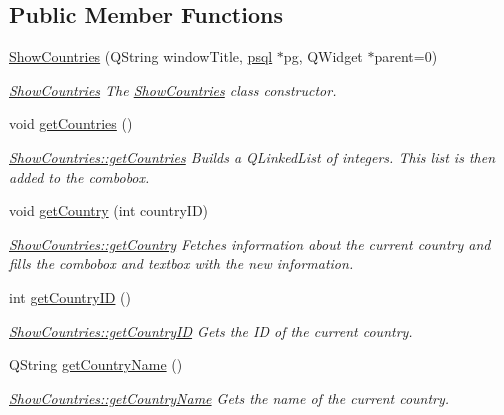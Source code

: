 \subsection*{Public Member Functions}
\begin{DoxyCompactItemize}
\item 
\hyperlink{class_show_countries_a509e0b6ebeb2fb580e7985b81b3f77e6}{Show\+Countries} (Q\+String window\+Title, \hyperlink{classpsql}{psql} $\ast$pg, Q\+Widget $\ast$parent=0)
\begin{DoxyCompactList}\small\item\em \hyperlink{class_show_countries}{Show\+Countries} The \hyperlink{class_show_countries}{Show\+Countries} class constructor. \end{DoxyCompactList}\item 
\mbox{\label{class_show_countries_a93e4a320155473e2af80476f5a4648a3}} 
void \hyperlink{class_show_countries_a93e4a320155473e2af80476f5a4648a3}{get\+Countries} ()
\begin{DoxyCompactList}\small\item\em \hyperlink{class_show_countries_a93e4a320155473e2af80476f5a4648a3}{Show\+Countries\+::get\+Countries} Builds a Q\+Linked\+List of integers. This list is then added to the combobox. \end{DoxyCompactList}\item 
void \hyperlink{class_show_countries_a5f39325688b0e71fa613d5b33810ce02}{get\+Country} (int country\+ID)
\begin{DoxyCompactList}\small\item\em \hyperlink{class_show_countries_a5f39325688b0e71fa613d5b33810ce02}{Show\+Countries\+::get\+Country} Fetches information about the current country and fills the combobox and textbox with the new information. \end{DoxyCompactList}\item 
int \hyperlink{class_show_countries_a02956713871e89645487500f3c9b77b8}{get\+Country\+ID} ()
\begin{DoxyCompactList}\small\item\em \hyperlink{class_show_countries_a02956713871e89645487500f3c9b77b8}{Show\+Countries\+::get\+Country\+ID} Gets the ID of the current country. \end{DoxyCompactList}\item 
Q\+String \hyperlink{class_show_countries_afc6d5f6817bd4c9388aef3d52d09d768}{get\+Country\+Name} ()
\begin{DoxyCompactList}\small\item\em \hyperlink{class_show_countries_afc6d5f6817bd4c9388aef3d52d09d768}{Show\+Countries\+::get\+Country\+Name} Gets the name of the current country. \end{DoxyCompactList}\item 

\end{DoxyCompactItemize}
